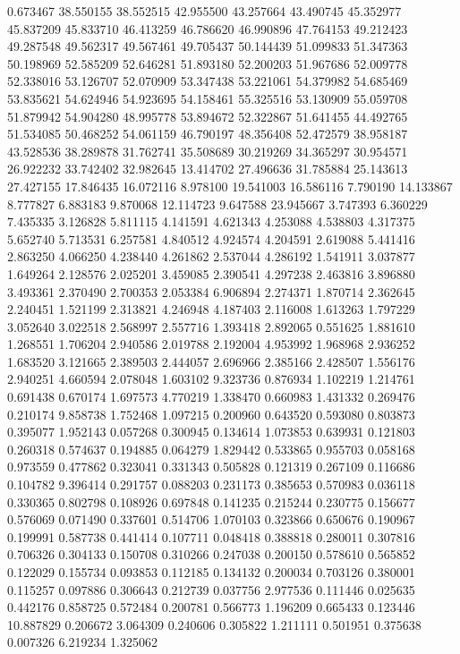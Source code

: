 0.673467
38.550155
38.552515
42.955500
43.257664
43.490745
45.352977
45.837209
45.833710
46.413259
46.786620
46.990896
47.764153
49.212423
49.287548
49.562317
49.567461
49.705437
50.144439
51.099833
51.347363
50.198969
52.585209
52.646281
51.893180
52.200203
51.967686
52.009778
52.338016
53.126707
52.070909
53.347438
53.221061
54.379982
54.685469
53.835621
54.624946
54.923695
54.158461
55.325516
53.130909
55.059708
51.879942
54.904280
48.995778
53.894672
52.322867
51.641455
44.492765
51.534085
50.468252
54.061159
46.790197
48.356408
52.472579
38.958187
43.528536
38.289878
31.762741
35.508689
30.219269
34.365297
30.954571
26.922232
33.742402
32.982645
13.414702
27.496636
31.785884
25.143613
27.427155
17.846435
16.072116
8.978100
19.541003
16.586116
7.790190
14.133867
8.777827
6.883183
9.870068
12.114723
9.647588
23.945667
3.747393
6.360229
7.435335
3.126828
5.811115
4.141591
4.621343
4.253088
4.538803
4.317375
5.652740
5.713531
6.257581
4.840512
4.924574
4.204591
2.619088
5.441416
2.863250
4.066250
4.238440
4.261862
2.537044
4.286192
1.541911
3.037877
1.649264
2.128576
2.025201
3.459085
2.390541
4.297238
2.463816
3.896880
3.493361
2.370490
2.700353
2.053384
6.906894
2.274371
1.870714
2.362645
2.240451
1.521199
2.313821
4.246948
4.187403
2.116008
1.613263
1.797229
3.052640
3.022518
2.568997
2.557716
1.393418
2.892065
0.551625
1.881610
1.268551
1.706204
2.940586
2.019788
2.192004
4.953992
1.968968
2.936252
1.683520
3.121665
2.389503
2.444057
2.696966
2.385166
2.428507
1.556176
2.940251
4.660594
2.078048
1.603102
9.323736
0.876934
1.102219
1.214761
0.691438
0.670174
1.697573
4.770219
1.338470
0.660983
1.431332
0.269476
0.210174
9.858738
1.752468
1.097215
0.200960
0.643520
0.593080
0.803873
0.395077
1.952143
0.057268
0.300945
0.134614
1.073853
0.639931
0.121803
0.260318
0.574637
0.194885
0.064279
1.829442
0.533865
0.955703
0.058168
0.973559
0.477862
0.323041
0.331343
0.505828
0.121319
0.267109
0.116686
0.104782
9.396414
0.291757
0.088203
0.231173
0.385653
0.570983
0.036118
0.330365
0.802798
0.108926
0.697848
0.141235
0.215244
0.230775
0.156677
0.576069
0.071490
0.337601
0.514706
1.070103
0.323866
0.650676
0.190967
0.199991
0.587738
0.441414
0.107711
0.048418
0.388818
0.280011
0.307816
0.706326
0.304133
0.150708
0.310266
0.247038
0.200150
0.578610
0.565852
0.122029
0.155734
0.093853
0.112185
0.134132
0.200034
0.703126
0.380001
0.115257
0.097886
0.306643
0.212739
0.037756
2.977536
0.111446
0.025635
0.442176
0.858725
0.572484
0.200781
0.566773
1.196209
0.665433
0.123446
10.887829
0.206672
3.064309
0.240606
0.305822
1.211111
0.501951
0.375638
0.007326
6.219234
1.325062
